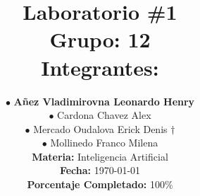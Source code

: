 
\newcommand{\NumeroLaboratorio}{1}		%
\newcommand{\PorcentajeCompletado}{100}	%





\title{
\hspace{-0.1cm}\LARGE{Laboratorio \#\NumeroLaboratorio} \\\vspace{0.05cm}
{\large Grupo: 12} \\\vspace{0.2cm}
{\large Integrantes:} \\\vspace{0.2cm}
}

\author{
\hspace{0.5cm}$\bullet$ \textbf{Añez Vladimirovna Leonardo Henry}\\
\hspace{0.5cm}$\bullet$ Cardona Chavez Alex\\
\hspace{0.5cm}$\bullet$ Mercado Oudalova Erick Denis $\dagger$\\
\hspace{0.5cm}$\bullet$ Mollinedo Franco Milena \\\vspace{0.2cm}
\textbf{Materia:} Inteligencia Artificial \\\vspace{0.2cm}
\textbf{Fecha:} \today \\\vspace{0.2cm}
\textbf{Porcentaje Completado:} \PorcentajeCompletado$\%$
}
\maketitle